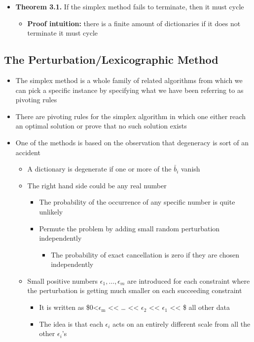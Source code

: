 \documentclass[11pt]{article}
\begin{document}
\begin{itemize}
\item \textbf{Theorem 3.1.} If the simplex method fails to terminate, then it must cycle
\begin{itemize}
\item \textbf{Proof intuition:} there is a finite amount of dictionaries if it does not terminate it must cycle
\end{itemize}
\end{itemize}

\subsection{The Perturbation/Lexicographic Method}
\label{sec:orgf21393c}
\begin{itemize}
\item The simplex method is a whole family of related algorithms from which we can pick a specific instance by specifying what we have been referring to as pivoting rules
\item There are pivoting rules for the simplex algorithm in which one either reach an optimal solution or prove that no such solution exists
\item One of the methods is based on the observation that degeneracy is sort of an accident
\begin{itemize}
\item A dictionary is degenerate if one or more of the \(\bar b_i\) vanish
\item The right hand side could be any real number
\begin{itemize}
\item The probability of the occurrence of any specific number is quite unlikely
\item Permute the problem by adding small random perturbation independently
\begin{itemize}
\item The probability of exact cancellation is zero if they are chosen independently
\end{itemize}
\end{itemize}
\item Small positive numbers \(\epsilon_1, \dots, \epsilon_m\) are introduced for each constraint where the perturbation is getting much smaller on each succeeding constraint
\begin{itemize}
\item It is written as \$0<\(\epsilon_{\text{m}}\) << \dots{} << \(\epsilon_{\text{2}}\) << \(\epsilon_{\text{1}}\) << \$ all other data
\item The idea is that each \(\epsilon_i\) acts on an entirely different scale from all the other \(\epsilon_i\)'s

\end{itemize}
\end{itemize}
\end{itemize}
\end{document}
